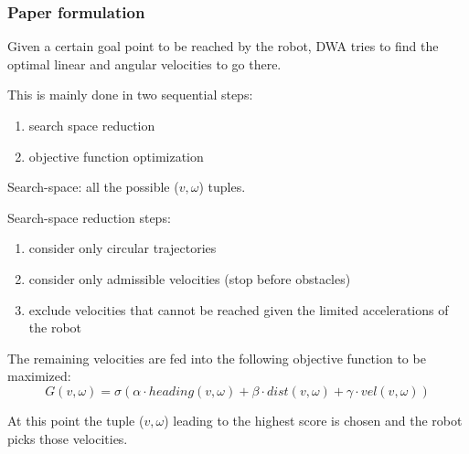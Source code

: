 \documentclass{beamer}
\begin{document}
\begin{frame}[allowframebreaks]
\frametitle{Paper formulation}

Given a certain goal point to be reached by the robot, DWA tries to find the optimal linear and angular velocities to go there.

\vspace{2em}

This is mainly done in two sequential steps:
\begin{enumerate}
  \item search space reduction
  \item objective function optimization
\end{enumerate}

\framebreak

Search-space: all the possible ($v,\omega$) tuples.

\vspace{2em}

Search-space reduction steps:
\begin{enumerate}
  \item consider only circular trajectories
  \item consider only admissible velocities (stop before obstacles)
  \item exclude velocities that cannot be reached given the limited accelerations
  of the robot
\end{enumerate}

\framebreak

The remaining velocities are fed into the following objective function to
be maximized:
$$
G(v, \omega) = \sigma(\alpha \cdot heading(v, \omega)
+ \beta \cdot dist(v, \omega) + \gamma \cdot vel(v, \omega))
$$

\vspace{2em}

At this point the tuple ($v,\omega$) leading to the highest score is chosen
and the robot picks those velocities.

\end{frame}

\end{document}
